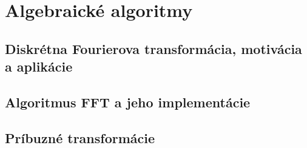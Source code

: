 \documentclass[../main.tex]{subfiles}
\begin{document}
\section{Algebraické algoritmy}
\subsection{Diskrétna Fourierova transformácia, motivácia a aplikácie}
\subsection{Algoritmus FFT a jeho implementácie}
\subsection{Príbuzné transformácie}
\end{document}
